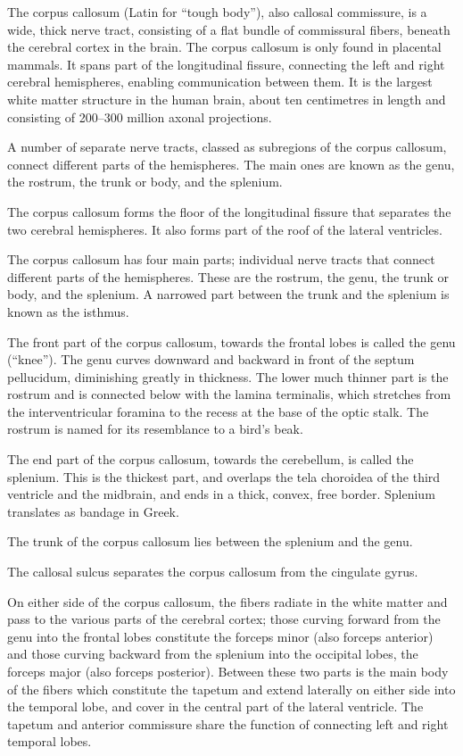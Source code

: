The corpus callosum (Latin for ``tough body''), also callosal commissure, is a wide, thick nerve tract, consisting of a flat bundle of commissural fibers, beneath the cerebral cortex in the brain. The corpus callosum is only found in placental mammals. It spans part of the longitudinal fissure, connecting the left and right cerebral hemispheres, enabling communication between them. It is the largest white matter structure in the human brain, about ten centimetres in length and consisting of 200--300 million axonal projections.

A number of separate nerve tracts, classed as subregions of the corpus callosum, connect different parts of the hemispheres. The main ones are known as the genu, the rostrum, the trunk or body, and the splenium.

The corpus callosum forms the floor of the longitudinal fissure that separates the two cerebral hemispheres. It also forms part of the roof of the lateral ventricles.

The corpus callosum has four main parts; individual nerve tracts that connect different parts of the hemispheres. These are the rostrum, the genu, the trunk or body, and the splenium. A narrowed part between the trunk and the splenium is known as the isthmus.

The front part of the corpus callosum, towards the frontal lobes is called the genu (``knee''). The genu curves downward and backward in front of the septum pellucidum, diminishing greatly in thickness. The lower much thinner part is the rostrum and is connected below with the lamina terminalis, which stretches from the interventricular foramina to the recess at the base of the optic stalk. The rostrum is named for its resemblance to a bird's beak.

The end part of the corpus callosum, towards the cerebellum, is called the splenium. This is the thickest part, and overlaps the tela choroidea of the third ventricle and the midbrain, and ends in a thick, convex, free border. Splenium translates as bandage in Greek.

The trunk of the corpus callosum lies between the splenium and the genu.

The callosal sulcus separates the corpus callosum from the cingulate gyrus.

On either side of the corpus callosum, the fibers radiate in the white matter and pass to the various parts of the cerebral cortex; those curving forward from the genu into the frontal lobes constitute the forceps minor (also forceps anterior) and those curving backward from the splenium into the occipital lobes, the forceps major (also forceps posterior). Between these two parts is the main body of the fibers which constitute the tapetum and extend laterally on either side into the temporal lobe, and cover in the central part of the lateral ventricle. The tapetum and anterior commissure share the function of connecting left and right temporal lobes.

